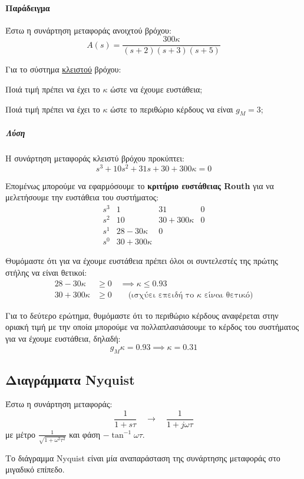 \documentclass[11pt,a4paper,notitlepage,fleqn]{article}
\begin{document}
\paragraph{Παράδειγμα}
Έστω η συνάρτηση μεταφοράς ανοιχτού βρόχου:
\[
A(s) = \frac{300κ}{(s+2)(s+3)(s+5)}
\]

Για το σύστημα \underline{κλειστού} βρόχου:
\begin{enumparen}
	\item Ποιά τιμή πρέπει να έχει το \( κ \) ώστε να έχουμε ευστάθεια;
	\item Ποιά τιμή πρέπει να έχει το \( κ \) ώστε το περιθώριο κέρδους
	να είναι \( g_M = 3 \);
\end{enumparen}

\subparagraph{Λύση}
Η συνάρτηση μεταφοράς κλειστύ βρόχου προκύπτει:
\[
s^3+10s^2+31s+30+300κ = 0
\]

Επομένως μπορούμε να εφαρμόσουμε το \textbf{κριτήριο ευστάθειας Routh}
για να μελετήσουμε την ευστάθεια του συστήματος:
\[
\begin{array}{r|ccc}
s^3 & 1 & 31 & 0 \\
s^2 & 10 & 30+300κ & 0 \\
s^1 & 28-30κ & 0 & \\
s^0 & 30+300κ & &
\end{array}
\]

Θυμόμαστε ότι για να έχουμε ευστάθεια πρέπει όλοι οι συντελεστές
της πρώτης στήλης να είναι θετικοί:
\begin{align*}
	28 - 30κ &\geq 0 \quad \implies \boxed{κ \leq 0.93} \\
	30 + 300κ &\geq 0 \qquad \text{(ισχύει επειδή το $κ$ είναι θετικό)}
\end{align*}

Για το δεύτερο ερώτημα, θυμόμαστε ότι το περιθώριο κέρδους αναφέρεται
στην οριακή τιμή με την οποία μπορούμε να πολλαπλασιάσουμε το κέρδος του συστήματος για να έχουμε ευστάθεια, δηλαδή:
\[
g_M κ = 0.93 \implies \boxed{κ=0.31}
\]

\subsection{Διαγράμματα Nyquist}
Έστω η συνάρτηση μεταφοράς:
\[
\frac{1}{1+sτ} \quad \rightarrow \quad
\frac{1}{1+j\omega τ}
\]
με μέτρο \( \displaystyle \frac{1}{\sqrt{1+\omega^2τ^2}} \)
και φάση \( -\tan^{-1} \omega τ \).

Το διάγραμμα Nyquist είναι μία αναπαράσταση της συνάρτησης μεταφοράς στο
μιγαδικό επίπεδο.
\end{document}
